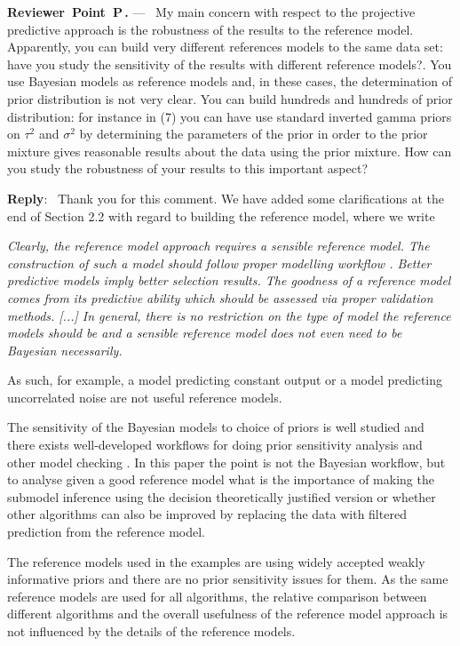 \documentclass[11pt]{article}
\newcounter{reviewer}
\newcounter{point}[reviewer]
\renewcommand{\thepoint}{P\,\thereviewer.\arabic{point}}
\newenvironment{point}
   {\refstepcounter{point} \bigskip \noindent \begin{sf}{\textbf{Reviewer~Point~\thepoint} } ---\ }
   {\par \end{sf}}
\newenvironment{reply}
   {\medskip \noindent \textbf{Reply}:\  }
   {\medskip}
\begin{document}
\begin{point}
My main concern with respect to the projective predictive approach is the robustness of the results to the reference model. Apparently, you can build very different references models to the same data set: have you study the sensitivity of the results with different reference models?. You use Bayesian models as reference models and, in these cases, the determination of prior distribution is not very clear. You can build hundreds and hundreds of prior distribution: for instance in (7) you can have use standard inverted gamma priors on $\tau^2$ and $\sigma^2$ by determining the parameters of the prior in order to the prior mixture gives reasonable results about the data using the prior mixture. How can you study the robustness of your results to this important aspect?
\end{point}

\begin{reply}
Thank you for this comment. We have added some clarifications at the end of Section 2.2 with regard to building the reference model, where we write

\vspace{0.5\baselineskip}
\textit{
Clearly, the reference model approach requires a sensible reference model. The construction of such a model should follow proper modelling workflow \citep[see, e.g.][]{gelman2020bayesian}. Better predictive models imply better selection results. The goodness of a reference model comes from its predictive ability which should be assessed via proper validation methods. [...] In general, there is no restriction on the type of model the reference models should be and a sensible reference model does not even need to be Bayesian necessarily.
}
\vspace{0.5\baselineskip}

As such, for example, a model predicting constant output or a model predicting uncorrelated noise are not useful reference models.

The sensitivity of the Bayesian models to choice of priors is well studied and there exists well-developed workflows for doing prior sensitivity analysis and other model checking \citep[see, e.g.][]{gelman2020bayesian}. In this paper the point is not the Bayesian workflow, but to analyse given a good reference model what is the importance of making the submodel inference using the decision theoretically justified version or whether other algorithms can also be improved by replacing the data with filtered prediction from the reference model. 

The reference models used in the examples are using widely accepted weakly informative priors and there are no prior sensitivity issues for them. As the same reference models are used for all algorithms, the relative comparison between different algorithms and the overall usefulness of the reference model approach is not influenced by the details of the reference models.
\end{reply}
\end{document}
